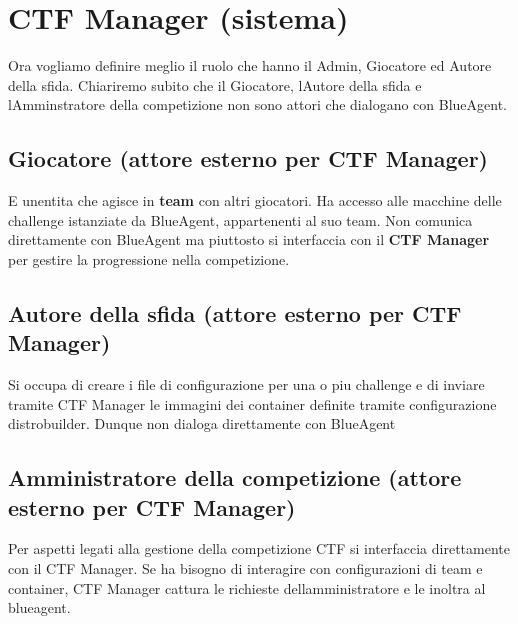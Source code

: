 \section{CTF Manager (sistema)}\label{ctf-manager-sistema}

Ora vogliamo definire meglio il ruolo che hanno il Admin, Giocatore ed
Autore della sfida. Chiariremo subito che il Giocatore,
l\textquotesingle Autore della sfida e l\textquotesingle Amminstratore
della competizione non sono attori che dialogano con BlueAgent.

\subsection{Giocatore (attore esterno per CTF
Manager)}\label{giocatore-attore-esterno-per-ctf-manager}

E\textquotesingle{} un\textquotesingle entita che agisce in
\textbf{team} con altri giocatori. Ha accesso alle macchine delle
challenge istanziate da BlueAgent, appartenenti al suo team. Non
comunica direttamente con BlueAgent ma piuttosto si interfaccia con il
\textbf{CTF Manager} per gestire la progressione nella competizione.

\subsection{Autore della sfida (attore esterno per CTF
Manager)}\label{autore-della-sfida-attore-esterno-per-ctf-manager}

Si occupa di creare i file di configurazione per una o piu challenge e
di inviare tramite CTF Manager le immagini dei container definite
tramite configurazione distrobuilder. Dunque non dialoga direttamente
con BlueAgent

\subsection{Amministratore della competizione (attore esterno per CTF
Manager)}\label{amministratore-della-competizione-attore-esterno-per-ctf-manager}

Per aspetti legati alla gestione della competizione CTF si interfaccia
direttamente con il CTF Manager. Se ha bisogno di interagire con
configurazioni di team e container, CTF Manager cattura le richieste
dell\textquotesingle amministratore e le inoltra al blueagent.
